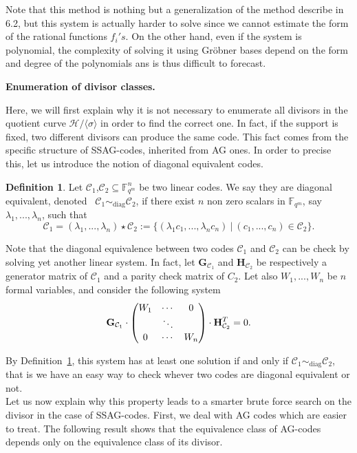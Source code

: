 \documentclass[10pt]{article}
\theoremstyle{definition}
\theoremstyle{definition}
\theoremstyle{definition}
\newtheorem{def1}[thm]{Definition}
\newcommand{\s}{\vspace{0.3cm}}
\newcommand{\cd}{\cdot}
\newcommand{\C}{\mathcal{C}}
\newcommand{\fqm}{\mathbb{F}_{q^m}}
\newcommand{\su}{\subseteq}
\begin{document}
Note that this method is nothing but a generalization of the method describe in 6.2, but this system is actually harder to solve since we cannot estimate the form of the rational functions $f_i's$. On the other hand, even if the system is polynomial, the complexity of solving it using Gröbner bases depend on the form and degree of the polynomials ans is thus difficult to forecast.

\s

\textbf{Enumeration of divisor classes.} 

\s

Here, we will first explain why it is not necessary to enumerate all divisors in the quotient curve $\mathcal{H}/ \langle \sigma \rangle$ in order to find the correct one. In fact, if the support is fixed, two different divisors can produce the same code. This fact comes from the specific structure of SSAG-codes, inherited from AG ones. In order to precise this, let us introduce the notion of diagonal equivalent codes.

\s

\begin{def1} \label{diag}
Let $\C_1$,$\C_2 \su \fqm^n$ be two linear codes. We say they are diagonal equivalent, denoted \ $\C_1 \sim_{\mathrm{diag}} \C_2$, if there exist $n$ non zero scalars in $\fqm$, say $\lambda_1,...,\lambda_n$, such that 
\[\C_1 = (\lambda_1,...,\lambda_n) \star \C_2 := \{(\lambda_1c_1,...,\lambda_nc_n) \ | \ (c_1,...,c_n) \in \C_2\}.\]
\end{def1} 

Note that the diagonal equivalence between two codes $\C_1$ and $\C_2$ can be check by solving yet another linear system. In fact, let $\mathbf{G}_{\C_1}$ and $\mathbf{H}_{\C_2}$ be respectively a generator matrix of $\C_1$ and a parity check matrix of $C_2$. Let also $W_1,...,W_n$ be $n$ formal variables, and consider the following system
\begin{equation} \label{equiv}
\mathbf{G}_{\C_1} \cd \begin{pmatrix}
W_1 & \cdots & 0 \\
\null & \ddots & \null \\
0 & \cdots & W_n
\end{pmatrix} \cd \mathbf{H}_{\C_2}^T = 0.
\end{equation}

By Definition~\ref{diag}, this system has at least one solution if and only if $\C_1 \sim_{\mathrm{diag}} \C_2$, that is we have an easy way to check whever two codes are diagonal equivalent or not. \\
Let us now explain why this property leads to a smarter brute force search on the divisor in the case of SSAG-codes. First, we deal with AG codes which are easier to treat. The following result shows that the equivalence class of AG-codes depends only on the equivalence class of its divisor.
\end{document}
